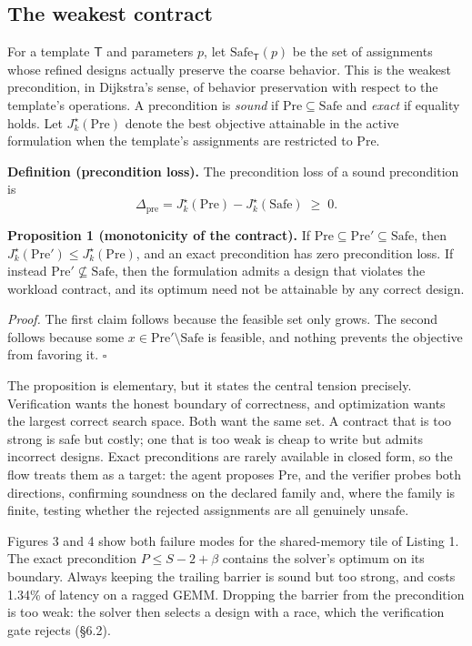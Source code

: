 \documentclass[11pt]{article}
\begin{document}
\hypertarget{the-weakest-contract}{%
\subsection{The weakest contract}\label{the-weakest-contract}}

For a template \(\mathsf T\) and parameters \(p\), let \(\mathrm{Safe}_{\mathsf T}(p)\) be the set of assignments whose refined designs actually preserve the coarse behavior. This is the weakest precondition, in Dijkstra's sense, of behavior preservation with respect to the template's operations. A precondition is \emph{sound} if \(\mathrm{Pre}\subseteq\mathrm{Safe}\) and \emph{exact} if equality holds. Let \(J^\star_k(\mathrm{Pre})\) denote the best objective attainable in the active formulation when the template's assignments are restricted to \(\mathrm{Pre}\).

\textbf{Definition (precondition loss).} The precondition loss of a sound precondition is
\[
\Delta_{\mathrm{pre}}=J^\star_k(\mathrm{Pre})-J^\star_k(\mathrm{Safe})\;\ge\;0.
\]

\textbf{Proposition 1 (monotonicity of the contract).} If \(\mathrm{Pre}\subseteq\mathrm{Pre}'\subseteq\mathrm{Safe}\), then \(J^\star_k(\mathrm{Pre}')\le J^\star_k(\mathrm{Pre})\), and an exact precondition has zero precondition loss. If instead \(\mathrm{Pre}'\not\subseteq\mathrm{Safe}\), then the formulation admits a design that violates the workload contract, and its optimum need not be attainable by any correct design.

\emph{Proof.} The first claim follows because the feasible set only grows. The second follows because some \(x\in\mathrm{Pre}'\setminus\mathrm{Safe}\) is feasible, and nothing prevents the objective from favoring it. \(\square\)

The proposition is elementary, but it states the central tension precisely. Verification wants the honest boundary of correctness, and optimization wants the largest correct search space. Both want the same set. A contract that is too strong is safe but costly; one that is too weak is cheap to write but admits incorrect designs. Exact preconditions are rarely available in closed form, so the flow treats them as a target: the agent proposes \(\mathrm{Pre}\), and the verifier probes both directions, confirming soundness on the declared family and, where the family is finite, testing whether the rejected assignments are all genuinely unsafe.

Figures 3 and 4 show both failure modes for the shared-memory tile of Listing 1. The exact precondition \(P\le S-2+\beta\) contains the solver's optimum on its boundary. Always keeping the trailing barrier is sound but too strong, and costs 1.34\% of latency on a ragged GEMM. Dropping the barrier from the precondition is too weak: the solver then selects a design with a race, which the verification gate rejects (§6.2).
\end{document}
